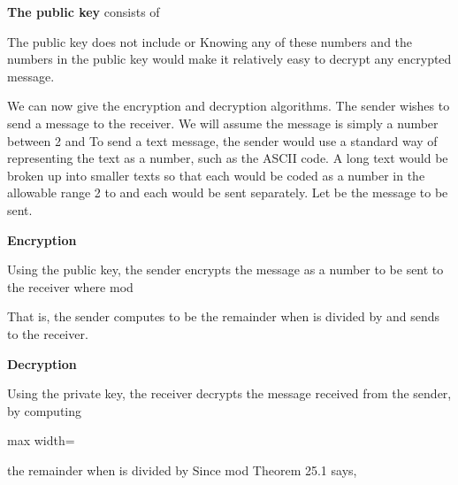 \documentclass[11pt,oneside]{article}
\begin{document}
\begin{BookBody}

\noindent \textbf{The public key} consists of



The public key does not include  or  Knowing any of these numbers and the numbers in the public key would make it relatively easy to decrypt any encrypted message.

We can now give the encryption and decryption algorithms. The sender wishes to send a message to the receiver. We will assume the message is simply a number between 2 and  To send a text message, the sender would use a standard way of representing the text as a number, such as the ASCII code. A long text would be broken up into smaller texts so that each would be coded as a number in the allowable range 2 to  and each would be sent separately. Let  be the message to be sent.

\textbf{Encryption}

\noindent Using the public key, the sender encrypts the message as a number  to be sent to the receiver where  mod 

\noindent That is, the sender computes  to be the remainder when  is divided by  and sends  to the receiver.

\textbf{Decryption}

\noindent Using the private key, the receiver decrypts  the message received from the sender, by computing

\begin{center}\begin{adjustbox}{max width=\linewidth}\end{adjustbox}\end{center}

\noindent the remainder when  is divided by  Since mod Theorem 25.1 says,


\end{BookBody}
\end{document}
